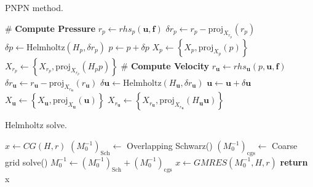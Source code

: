 \documentclass{sig-alternate}
\begin{document}
\begin{algorithm}
\caption{PNPN method.}\label{alg:code_struct}
\begin{algorithmic}
 
\State \# \textbf{Compute Pressure}
\State $r_p \leftarrow rhs_p(\mathbf{u}, \mathbf{f})$ 
\State $\delta r_p \leftarrow r_p - \text{proj}_{X_{r_p}}(r_p)$ 
\State $\delta p \leftarrow \text{Helmholtz}(H_p,\delta r_p)$ 
\State $p \leftarrow p + \delta p$ 
\State $X_p \leftarrow \left\{ X_p, \text{proj}_{X_{p}}(p) \right\}$ 
\State $X_{r_p} \leftarrow \left\{ X_{r_p}, \text{proj}_{X_{r_p}}(H_p p) \right\}$ 
\State \# \textbf{Compute Velocity}
\State $r_{\mathbf{u}} \leftarrow rhs_{\mathbf{u}}(p, \mathbf{u}, \mathbf{f})$ 
\State $\delta r_{\mathbf{u}} \leftarrow r_{\mathbf{u}} - \text{proj}_{X_{r_{\mathbf{u}}}}(r_{\mathbf{u}})$ 
\State $\delta {\mathbf{u}} \leftarrow \text{Helmholtz}(H_{\mathbf{u}},\delta r_{\mathbf{u}})$ 
\State ${\mathbf{u}} \leftarrow \mathbf{u} + \delta \mathbf{u}$ 
\State $X_{\mathbf{u}} \leftarrow \left\{ X_{\mathbf{u}}, \text{proj}_{X_{\mathbf{u}}}(\mathbf{u}) \right\}$ 
\State $X_{r_{\mathbf{u}}} \leftarrow \left\{ X_{r_{\mathbf{u}}}, \text{proj}_{X_{r_\mathbf{u}}}(H_{\mathbf{u}} \mathbf{u}) \right\}$ 
\EndFor
\EndProcedure
\end{algorithmic}
\end{algorithm}

\begin{algorithm}
\caption{Helmholtz solve.}\label{alg:helmholtz}
\begin{algorithmic}
\State $x \leftarrow CG(H, r)$
\State $\left(M_0^{-1}\right)_{\text{Sch}} \leftarrow$ Overlapping Schwarz()
\State $\left(M_0^{-1}\right)_{\text{cgs}} \leftarrow$ Coarse grid solve() 
\State $M_0^{-1} \leftarrow \left(M_0^{-1}\right)_{\text{Sch}} + \left(M_0^{-1}\right)_{\text{cgs}}$
\State $x \leftarrow GMRES(M_0^{-1}, H, r)$
\EndIf
\State \textbf{return} x
\EndProcedure
\end{algorithmic}
\end{algorithm}
\end{document}
